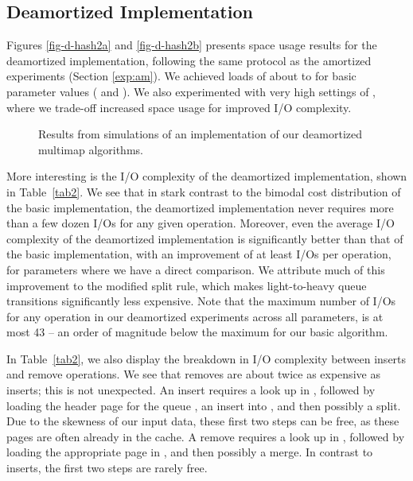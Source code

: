 \documentclass[11pt,letterpaper]{article}
\begin{document}
\subsection{Deamortized Implementation}
\label{exp:deam}

Figures \ref{fig-d-hash2a} and \ref{fig-d-hash2b} presents space usage results for the 
deamortized implementation, following the same protocol as the amortized 
experiments (Section \ref{exp:am}).  We achieved loads of about  to  
for basic parameter values ( and ). We also experimented with very
high settings of , where we trade-off increased space usage for improved I/O complexity.

\setlength{\figwidth}{0.46\textwidth}
\begin{figure*}[!h]
\centering
{}
\vspace{-0.2cm}
\caption{Results from simulations of an implementation of our deamortized multimap algorithms.}
\end{figure*}


More interesting is the I/O complexity of the deamortized implementation,
shown in Table~\ref{tab2}. 
We see that in stark contrast to the bimodal cost distribution of the basic 
implementation, the deamortized implementation never requires more than a few 
dozen I/Os for any given operation. 
Moreover, even the average I/O complexity of the deamortized implementation is 
significantly better than that of the basic implementation, with an improvement
of at least  I/Os per operation, for parameters where we have a direct comparison. 
We attribute much of this improvement to the modified split rule, 
which makes light-to-heavy queue transitions significantly less expensive.
Note that the maximum number of I/Os for any operation in our deamortized experiments
across all parameters, is at most 43 -- an order of magnitude below 
the maximum for our basic algorithm. 



In Table~\ref{tab2}, we also display the breakdown in I/O complexity between 
inserts and remove operations. We see that removes are about twice as expensive
as inserts; this is not unexpected.  An insert requires a look up in , 
followed by loading the header page for the queue , 
an insert into , and then possibly a split.  
Due to the skewness of our input data, these first two steps can be free, 
as these pages are often already in the cache. 
A remove requires a look up in , followed by
loading the appropriate page in , and then possibly a merge.  
In contrast to inserts, the first two steps are rarely free. 
\end{document}
